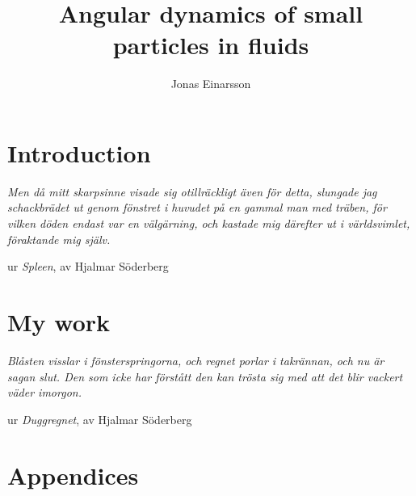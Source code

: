 \documentclass[licentiate,nocover,g5paper,11pt]{gu-thesis}
\title{Angular dynamics of small particles in fluids}
\author{Jonas Einarsson} %
\begin{document}
\pagestyle{empty}
\setcounter{page}{-99} %
\maketitlepage
\clearpage\makeprintinfopage
\cleardoublepage\makeabstractpage
\cleardoublepage\maketableofpaperspage



\cleardoublepage\tableofcontents

\cleardoublepage{}
\pagestyle{fancy}
\part{Introduction} %
\thispagestyle{empty}
 


\cleardoublepage\thispagestyle{fb}
{
\null\vfill
\centering
\parbox{8cm}{%
  \raggedright{\large\itshape%
Men då mitt skarpsinne visade sig otillräckligt även för detta, slungade jag schackbrädet ut genom fönstret i huvudet på en gammal man med träben, för vilken döden endast var en välgärning, och kastade mig därefter ut i världsvimlet, föraktande mig själv.\par\bigskip
  }   
  \raggedleft\large{ur \emph{Spleen}, av Hjalmar Söderberg}\par%
}
\vfill\vfill
}



\newpage\thispagestyle{fb}\cleardoublepage
\part{My work} %
\thispagestyle{fb}

\thispagestyle{fb}\cleardoublepage
\thispagestyle{fb}
{
\null\vfill
\centering
\parbox{8cm}{%
  \raggedright{\large\itshape%
Blåsten visslar i fönsterspringorna, och regnet porlar i takrännan, och nu är sagan slut. Den som icke har förstått den kan trösta sig med att det blir vackert väder imorgon.\par\bigskip
  }   
  \raggedleft\large{ur \emph{Duggregnet}, av Hjalmar Söderberg}\par%
}
\vfill\vfill
}
\newpage\thispagestyle{fb}\cleardoublepage
\thispagestyle{fb}\makeacknowledgementspage
\nocite{paperA,paperB,paperC,paperD,paperE,paperF,paperG}
\cleardoublepage
\nobibliography*

\cleardoublepage
\part{Appendices} %
\appendix


\thispagestyle{fb}
\appendix
%
\end{document}
